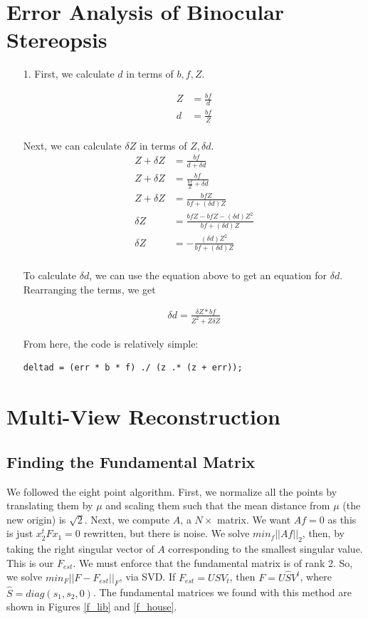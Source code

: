 \documentclass[11pt]{article}
\begin{document}
\newpage
\section{Error Analysis of Binocular Stereopsis}
\begin{enumerate}
\item[1.]
First, we calculate $d$ in terms of $b, f, Z$.

\begin{align*}
Z &= \frac{bf}{d} \\
d &= \frac{bf}{Z} \\
\end{align*}

Next, we can calculate $\delta Z$ in terms of $Z, \delta d$.
\begin{align*}
Z + \delta Z &= \frac{bf}{d + \delta d} \\
Z + \delta Z &= \frac{bf}{\frac{bf}{Z} + \delta d} \\
Z + \delta Z &= \frac{bfZ}{bf + (\delta d) Z} \\
\delta Z &= \frac{bfZ - bfZ - (\delta d) Z^2}{bf + (\delta d) Z} \\
\delta Z &= -\frac{(\delta d) Z^2}{bf + (\delta d) Z} \\
\end{align*}

To calculate $\delta d$, we can use the equation above to get an equation for
$\delta d$. Rearranging the terms, we get

\begin{align*}
\delta d = \frac{\delta Z * bf}{Z^2 + Z \delta Z}
\end{align*}

From here, the code is relatively simple:
\begin{verbatim}
deltad = (err * b * f) ./ (z .* (z + err));
\end{verbatim}

\end{enumerate}


\newpage
\section{Multi-View Reconstruction}
\subsection{Finding the Fundamental Matrix}
We followed the eight point algorithm. First, we normalize all the points by
translating them by $\mu$ and scaling them such that the mean distance from
$\mu$ (the new origin) is $\sqrt{2}$. Next, we compute $A$, a $N\times$ matrix.
We want $Af = 0$ as this is just $x_2^tFx_1 = 0$ rewritten, but there is noise.
We solve $min_f||Af||_2$, then, by taking the right singular vector of $A$
corresponding to the smallest singular value. This is our $F_{est}$. We must
enforce that the fundamental matrix is of rank 2. So, we solve
$min_F||F-F_{est}||_F$, via SVD. If $F_{est} = USV_t$, then $F = U\hat{S}V^t$,
where $\hat{S} = diag(s_1, s_2, 0)$. The fundamental matrices we found with
this method are shown in Figures \ref{f_lib} and \ref{f_house}.
\end{document}
